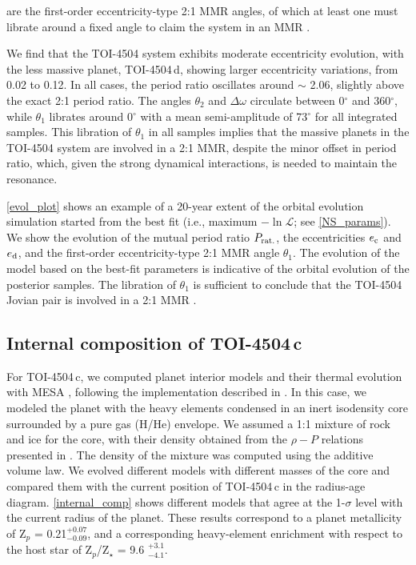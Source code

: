 \documentclass[twocolumn,twocolappendix]{aastex631}
\let\orgautoref\autoref
\renewcommand{\autoref}
        {\def\equationautorefname{Eq.}%
         \def\figureautorefname{Fig.}%
         \def\sectionautorefname{Sect.}%
         \def\subsectionautorefname{Sect.}%
         \def\subsubsectionautorefname{Sect.}%
         \orgautoref}
\begin{document}
\noindent
are the first-order eccentricity-type 2:1 MMR angles, of which at least one must librate 
around a fixed angle to claim the system in an MMR \citep[see][]{Lee2004}. 

We find that the TOI-4504 system exhibits moderate eccentricity evolution, with the less massive planet, TOI-4504\,d, showing larger eccentricity variations, from 0.02 to 0.12. In all cases, the period ratio oscillates around $\sim$ 2.06, slightly above the exact 2:1 period ratio. The angles $\theta_2$ and $\Delta\omega$ circulate between  0$^\circ$ and 360$^\circ$, while $\theta_1$ librates around 0$^\circ$ with a mean semi-amplitude of 73$^\circ$ for all integrated samples. This libration of $\theta_1$ in all samples implies that the massive planets in the TOI-4504 system are involved in a 2:1 MMR, despite the minor offset in period ratio, which, given the strong dynamical interactions, is needed to maintain the resonance.


\autoref{evol_plot} shows an example of a 20-year extent of the orbital evolution simulation started from the best fit (i.e., maximum $-\ln\mathcal{L}$; see \autoref{NS_params}). We show the evolution of the mutual period ratio $P_{\rm rat.}$, the eccentricities $e_{\rm c}$ and $e_{\rm d}$, and the first-order eccentricity-type 2:1 MMR angle $\theta_1$. The evolution of the model based on the best-fit parameters is indicative of the orbital evolution of the posterior samples. The libration of $\theta_1$ is sufficient to conclude that the TOI-4504 Jovian pair is involved in a 2:1 MMR \citep[][]{Lee2004}. 


\subsection{Internal composition of TOI-4504\,c}
For TOI-4504\,c, we computed planet interior models and their thermal evolution with {\textsc MESA} \citep{mesa1,mesa2}, following the implementation described in \cite{jones2024}. In this case, we modeled the planet with the heavy elements condensed in an inert isodensity core surrounded by a pure gas (H/He) envelope.  
We assumed a 1:1 mixture of rock and ice for the core, with their density obtained from the $\rho-P$ relations 
presented in \cite{hubb1989}. The density of the mixture was computed using the additive volume law. 
We evolved different models with different masses of the core and compared them with the current position of TOI-4504\,c 
in the radius-age diagram. \autoref{internal_comp} shows different models that agree at the 1-$\sigma$ level with the current
radius of the planet. These results correspond to a planet metallicity of Z$_p$  = 0.21$^{+0.07}_{-0.09}$, and a      
corresponding heavy-element enrichment with respect to the host star of Z$_p$/Z$_\star$ = 9.6 $^{+3.1}_{-4.1}$.
\end{document}
